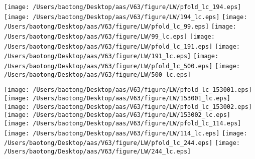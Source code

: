 \documentclass{aastex63}
\begin{document}
\clearpage
\begin{figure*}[!ht]
\centering
\texttt{[image: /Users/baotong/Desktop/aas/V63/figure/LW/pfold\_lc\_194.eps]}
\hfill
\texttt{[image: /Users/baotong/Desktop/aas/V63/figure/LW/194\_lc.eps]}
\hfill
{}
\texttt{[image: /Users/baotong/Desktop/aas/V63/figure/LW/pfold\_lc\_99.eps]}
\hfill
\texttt{[image: /Users/baotong/Desktop/aas/V63/figure/LW/99\_lc.eps]}
\hfill
{}
\texttt{[image: /Users/baotong/Desktop/aas/V63/figure/LW/pfold\_lc\_191.eps]}
\hfill
\texttt{[image: /Users/baotong/Desktop/aas/V63/figure/LW/191\_lc.eps]}
\hfill
{}
\texttt{[image: /Users/baotong/Desktop/aas/V63/figure/LW/pfold\_lc\_500.eps]}
\hfill
\texttt{[image: /Users/baotong/Desktop/aas/V63/figure/LW/500\_lc.eps]}
\hfill
{}
\end{figure*}
\clearpage
\begin{figure*}[!ht]
\centering
\texttt{[image: /Users/baotong/Desktop/aas/V63/figure/LW/pfold\_lc\_153001.eps]}
\hfill
\texttt{[image: /Users/baotong/Desktop/aas/V63/figure/LW/153001\_lc.eps]}
\hfill
{}
\texttt{[image: /Users/baotong/Desktop/aas/V63/figure/LW/pfold\_lc\_153002.eps]}
\hfill
\texttt{[image: /Users/baotong/Desktop/aas/V63/figure/LW/153002\_lc.eps]}
\hfill
{}
\texttt{[image: /Users/baotong/Desktop/aas/V63/figure/LW/pfold\_lc\_114.eps]}
\hfill
\texttt{[image: /Users/baotong/Desktop/aas/V63/figure/LW/114\_lc.eps]}
\hfill
{}
\texttt{[image: /Users/baotong/Desktop/aas/V63/figure/LW/pfold\_lc\_244.eps]}
\hfill
\texttt{[image: /Users/baotong/Desktop/aas/V63/figure/LW/244\_lc.eps]}
\hfill
{}
\end{figure*}
\clearpage
\end{document}

